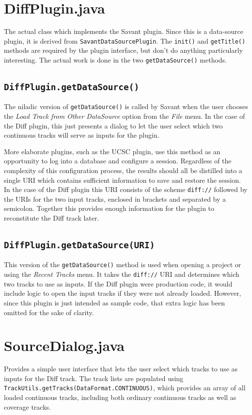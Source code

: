 \documentclass[times,11pt]{report}
\begin{document}
\section{DiffPlugin.java}
The actual class which implements the Savant plugin.  Since this is a data-source plugin, it is derived from {\tt SavantDataSourcePlugin}.  The {\tt init()} and {\tt getTitle()} methods are required by the plugin interface, but don't do anything particularly interesting.  The actual work is done in the two {\tt getDataSource()} methods.

\subsection{\tt DiffPlugin.getDataSource()}
The niladic version of {\tt getDataSource()} is called by Savant when the user chooses the \textit{Load Track from Other DataSource} option from the \textit{File} menu.  In the case of the Diff plugin, this just presents a dialog to let the user select which two continuous tracks will serve as inputs for the plugin.

More elaborate plugins, such as the UCSC plugin, use this method as an opportunity to log into a database and configure a session.  Regardless of the complexity of this configuration process, the results should all be distilled into a single URI which contains sufficient information to save and restore the session.  In the case of the Diff plugin this URI consists of the scheme {\tt diff://} followed by the URIs for the two input tracks, enclosed in brackets and separated by a semicolon.  Together this provides enough information for the plugin to reconstitute the Diff track later.

\subsection{\tt DiffPlugin.getDataSource(URI)}
This version of the {\tt getDataSource()} method is used when opening a project or using the \textit{Recent Tracks} menu.  It takes the {\tt diff://} URI and determines which two tracks to use as inputs.  If the Diff plugin were production code, it would include logic to open the input tracks if they were not already loaded.  However, since this plugin is just intended as sample code, that extra logic has been omitted for the sake of clarity.

\section{SourceDialog.java}
Provides a simple user interface that lets the user select which tracks to use as inputs for the Diff track.  The track lists are populated using {\tt TrackUtils.getTracks(DataFormat.CONTINUOUS)}, which provides an array of all loaded continuous tracks, including both ordinary continuous tracks as well as coverage tracks.
\end{document}
